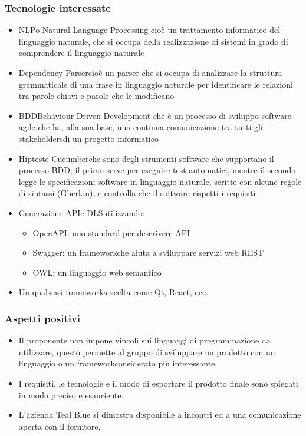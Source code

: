 \subsubsection{Tecnologie interessate}
\begin{itemize}
	\item NLP\glosp o Natural Language Processing cioè un trattamento informatico del linguaggio naturale, che si occupa della realizzazione di sistemi in grado di comprendere il linguaggio naturale	
	\item Dependency Parser\glosp cioè un parser che si occupa di analizzare la struttura grammaticale di una frase in linguaggio naturale per identificare le relazioni tra parole chiavi e parole che le modificano
	\item BDD\glosp Behaviour Driven Development che è un processo di sviluppo software agile che ha, alla sua base, una continua comunicazione tra tutti gli stakeholders\glosp di un progetto informatico
	\item Hiptest\glosp e Cucumber\glosp che sono degli strumenti software che supportano il processo BDD\glo; il primo serve per eseguire test automatici, mentre il secondo legge le specificazioni software in linguaggio naturale, scritte con alcune regole di sintassi (Gherkin\glo), e controlla che il software rispetti i requisiti
	\item Generazione API\glosp e DLS\glosp utilizzando:
	\begin{itemize}
		\item OpenAPI\glo: uno standard per descrivere API\glosp
		\item Swagger\glo: un framework\glosp che aiuta a sviluppare servizi web REST\glosp
		\item OWL\glo: un linguaggio web semantico
	\end{itemize}
	\item Un qualsiasi framework\glosp a scelta come Qt\glo, React\glo, ecc.
\end{itemize} 
\subsubsection{Aspetti positivi}
\begin{itemize} 
	\item Il proponente non impone vincoli sui linguaggi di programmazione da utilizzare, questo permette  al gruppo di sviluppare un prodotto con un linguaggio o un framework\glosp considerato più interessante. 
	\item I requisiti, le tecnologie e il modo di esportare il prodotto finale sono spiegati in modo preciso e esauriente.
	\item L'azienda Teal Blue si dimostra disponibile a incontri ed a una comunicazione aperta con il fornitore.
\end{itemize}
